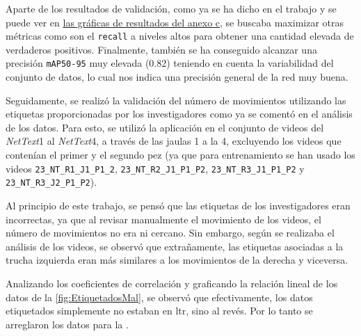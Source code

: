 Aparte de los resultados de validación, como ya se ha dicho en el trabajo y se puede ver en \hyperref[train:final]{las gráficas de resultados del anexo c}, se buscaba maximizar otras métricas como son 
el \texttt{recall} a niveles altos para obtener una cantidad elevada de verdaderos 
positivos. Finalmente, también se ha conseguido alcanzar una precisión \texttt{mAP50-95} muy elevada (0.82) teniendo en cuenta la variabilidad del conjunto de datos, lo cual nos indica una precisión 
general de la red muy buena.

\clearpage

Seguidamente, se realizó la validación del número de movimientos utilizando las etiquetas proporcionadas por los investigadores como ya se comentó en el análisis de los datos. Para esto, se utilizó la aplicación en el conjunto de 
videos del \textit{NetText}1 al \textit{NetText}4, a través de las jaulas 1 a la 4, excluyendo los videos que contenían el primer y el segundo pez (ya que para entrenamiento se han usado los videos \verb|23_NT_R1_J1_P1_2|, \verb|23_NT_R2_J1_P1_P2|, \verb|23_NT_R3_J1_P1_P2| 
y \verb|23_NT_R3_J2_P1_P2|).

Al principio de este trabajo, se pensó que las etiquetas de los investigadores eran incorrectas, ya que al revisar manualmente el movimiento de los videos, el número de movimientos no era ni cercano. Sin embargo, según se realizaba el 
análisis de los videos, se observó que extrañamente, las etiquetas asociadas a la trucha izquierda eran más similares a los movimientos de la derecha y viceversa.

Analizando los coeficientes de correlación y graficando la relación lineal de los datos de la \autoref{fig:EtiquetadosMal}, se observó que efectivamente, los datos etiquetados simplemente no estaban en \acrshort{ltr}, sino al revés. Por lo tanto se arreglaron 
los datos para la .

